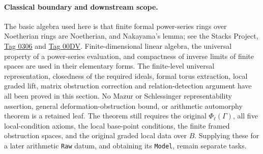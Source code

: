\paragraph{Classical boundary and downstream scope.}
The basic algebra used here is that finite formal power-series
rings over Noetherian rings are Noetherian, and Nakayama's lemma;
see the Stacks Project,
\href{https://stacks.math.columbia.edu/tag/0306}{Tag 0306}
and \href{https://stacks.math.columbia.edu/tag/00DV}{Tag 00DV}.
Finite-dimensional linear algebra, the universal property of a
power-series evaluation, and compactness of inverse limits of
finite spaces are used in their elementary forms.
The finite-level universal representation, closedness of the
required ideals, formal torus extraction, local graded lift,
matrix obstruction correction and relation-detection argument
have all been proved in this section.
No Mazur or Schlessinger representability assertion, general
deformation-obstruction bound, or arithmetic automorphy theorem
is a retained leaf.
The theorem still requires the original $\Phi_\ell(\Gamma)$,
all five local-condition axioms, the local base-point conditions,
the finite framed obstruction spaces, and the original graded
local data over $B$.  Supplying these for a later arithmetic
\texttt{Raw} datum, and obtaining its \texttt{Model}, remain
separate tasks.
